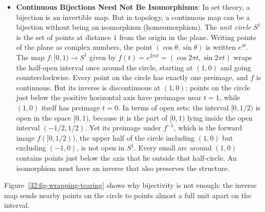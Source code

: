 \begin{itemize}
  \item \textbf{Continuous Bijections Need Not Be Isomorphisms}: In set theory, a bijection is an invertible map. But in topology, a continuous map can be a bijection without being an isomorphism (homeomorphism). The \emph{unit circle} $S^1$ is the set of points at distance $1$ from the origin in the plane. Writing points of the plane as complex numbers, the point $(\cos\theta, \sin\theta)$ is written $e^{i\theta}$. The map $f: [0, 1) \to S^1$ given by $f(t) = e^{2\pi i t} = (\cos 2\pi t, \sin 2\pi t)$ wraps the half-open interval once around the circle, starting at $(1, 0)$ and going counterclockwise. Every point on the circle has exactly one preimage, and $f$ is continuous. But its inverse is discontinuous at $(1, 0)$: points on the circle just below the positive horizontal axis have preimages near $t = 1$, while $(1, 0)$ itself has preimage $t = 0$. In terms of open sets: the interval $[0, 1/2)$ is open in the space $[0, 1)$, because it is the part of $[0, 1)$ lying inside the open interval $(-1/2, 1/2)$. Yet its preimage under $f^{-1}$, which is the forward image $f([0, 1/2))$, the upper half of the circle including $(1, 0)$ but excluding $(-1, 0)$, is not open in $S^1$. Every small arc around $(1, 0)$ contains points just below the axis that lie outside that half-circle. An isomorphism must have an inverse that also preserves the structure.
\end{itemize}

Figure~\ref{32:fig-wrapping-tearing} shows why bijectivity is not enough: the inverse map sends nearby points on the circle to points almost a full unit apart on the interval.

